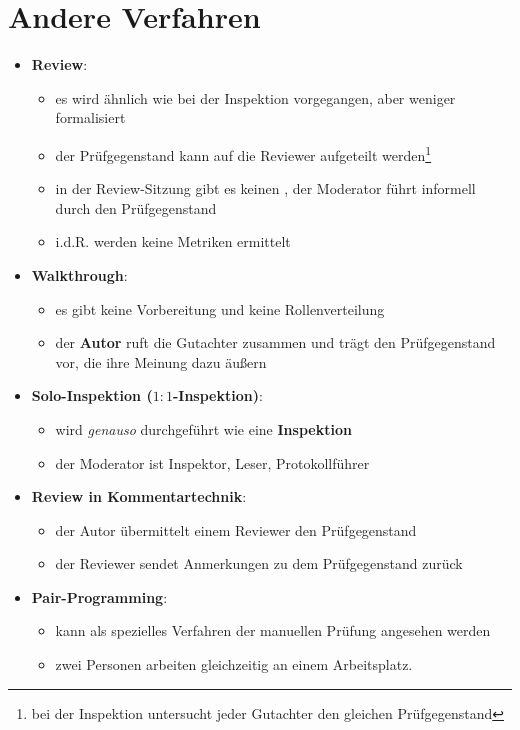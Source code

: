 \section{Andere Verfahren}\label{sec:andere-verfahren}

\begin{itemize}
    \item \textbf{Review}:
    \begin{itemize}
        \item es wird ähnlich wie bei der Inspektion vorgegangen, aber weniger formalisiert
        \item der Prüfgegenstand kann auf die Reviewer aufgeteilt werden\footnote{
            bei der Inspektion untersucht jeder Gutachter den gleichen Prüfgegenstand
        }
        \item in der Review-Sitzung gibt es keinen , der Moderator führt informell durch den Prüfgegenstand
        \item i.d.R. werden keine Metriken ermittelt
    \end{itemize}
    \item \textbf{Walkthrough}:
    \begin{itemize}
        \item es gibt keine Vorbereitung und keine Rollenverteilung
        \item der \textbf{Autor} ruft die Gutachter zusammen und trägt den Prüfgegenstand vor, die ihre Meinung dazu äußern
    \end{itemize}
    \item \textbf{Solo-Inspektion ($1:1$-Inspektion)}:
    \begin{itemize}
        \item wird \textit{genauso} durchgeführt wie eine \textbf{Inspektion}
        \item der Moderator ist Inspektor, Leser, Protokollführer
    \end{itemize}
    \item \textbf{Review in Kommentartechnik}:
    \begin{itemize}
        \item der Autor übermittelt einem Reviewer den Prüfgegenstand
        \item der Reviewer sendet Anmerkungen zu dem Prüfgegenstand zurück
    \end{itemize}
    \item \textbf{Pair-Programming}:
    \begin{itemize}
        \item kann als spezielles Verfahren der manuellen Prüfung angesehen werden
        \item zwei Personen arbeiten gleichzeitig an einem Arbeitsplatz.
    \end{itemize}
\end{itemize}

